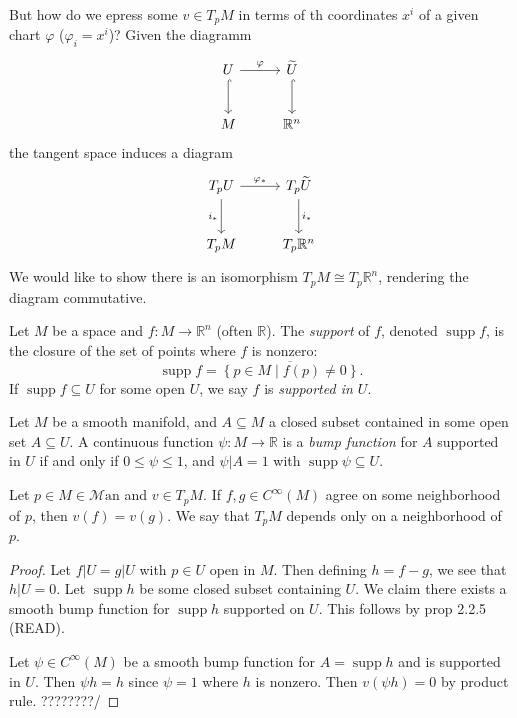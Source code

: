 
But how do we epress some $v\in T_pM$ in terms of th coordinates $x^i$ of a given chart $\varphi $ ($\varphi _i = x^i$)? Given the diagramm
\[\begin{tikzcd}[row sep = 2.5em, column sep = 2.5em]
U \ar[" \varphi  ", r] \ar[hook, d]  & \widetilde{U} \ar[hook, d]  \\
M & \mathbb{R} ^n
\end{tikzcd}\]
the tangent space induces a diagram
\[\begin{tikzcd}[row sep = 2.5em, column sep = 2.5em]
T_p U \ar[" \varphi _* ", r] \ar[" i_* "', d]  & T_p \widetilde{U} \ar[" i_* ", d]  \\
T_pM & T_p\mathbb{R} ^n
\end{tikzcd}\]
We would like to show there is an isomorphism $T_pM \cong T_p\mathbb{R} ^n$, rendering the diagram commutative.

\begin{definition}\label{1.2.13}
	Let $M$ be a space and $f : M \to \mathbb{R} ^n$ (often $\mathbb{R} $). The \emph{support} of $f$, denoted $\operatorname{supp} f$, is the closure of the set of points where $f$ is nonzero:
	\[
		\operatorname{supp} f = \overline{\left\{ p\in M\mid f(p)\neq 0 \right\} } 
	.\]
	If $\operatorname{supp} f \subseteq U$ for some open $U$, we say $f$ is \emph{supported in $U$}.
\end{definition}


\begin{definition}\label{1.2.14}
	Let $M$ be a smooth manifold, and $A\subseteq M$ a closed subset contained in some open set $A\subseteq U$. A continuous function $\psi : M \to \mathbb{R} $ is a \emph{bump function} for $A$ supported in $U$ if and only if $0\leq \psi \leq 1$, and $\psi|A=1$ with $\operatorname{supp} \psi \subseteq U$.
\end{definition}


\begin{proposition}\label{1.2.15}
	Let $p\in M\in \mathcal{M} \mathrm{an} $ and $v\in T_pM$. If $f,g\in C^\infty (M)$ agree on some neighborhood of $p$, then $v(f)=v(g)$. We say that $T_pM$ depends only on a neighborhood of $p$.
\end{proposition}
\begin{proof}
	Let $f|U=g|U$ with $p\in U$ open in $M$. Then defining $h=f-g$, we see that $h|U=0$. Let $\operatorname{supp} h$ be some closed subset containing $U$. We claim there exists a smooth bump function for $\operatorname{supp} h$ supported on $U$. This follows by prop  2.2.5 (READ).

	Let $\psi \in C^\infty (M)$ be a smooth bump function for $A=\operatorname{supp} h$ and is supported in $U$. Then $\psi h=h$ since $\psi =1$ where $h$ is nonzero. Then $v(\psi h)=0$ by product rule. ????????/
\end{proof}

